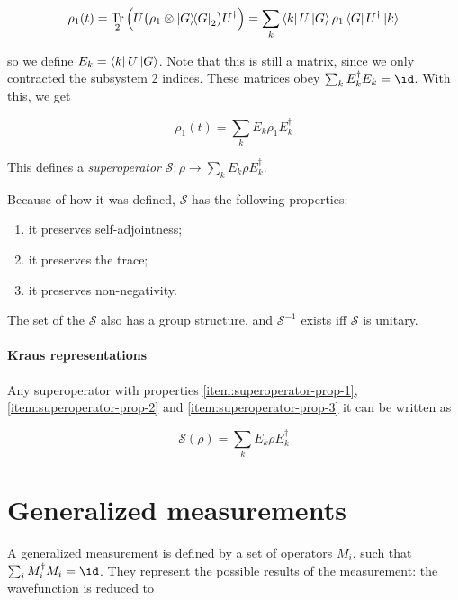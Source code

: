 \documentclass[main.tex]{subfiles}
\begin{document}
\begin{equation}
    \rho_1(t) = \Tr_{2} \qty(U\qty(\rho_1 \otimes \dyad{G}_2 )U^\dag)
    = \sum _k \bra{k} U \ket{G} \rho_1 \bra{G} U^\dag \ket{k}
\end{equation}

so we define \(E_k = \bra{k} U \ket{G}\). Note that this is still a matrix, since we only contracted the subsystem 2 indices. These matrices obey \(\sum _{k}  E_k ^\dag E_k = \id\).
With this, we get

\begin{equation}
    \rho_1 (t) = \sum _{k} E_k \rho_1 E_k ^\dag
\end{equation}

This defines a \emph{superoperator} \(\mathcal S: \rho \rightarrow \sum _k E_k \rho E_k ^\dag \).

Because of how it was defined, \(\mathcal S\) has the following properties:

\begin{enumerate}
    \item it preserves self-adjointness; \label{item:superoperator-prop-1}
    \item it preserves the trace;\label{item:superoperator-prop-2}
    \item it preserves non-negativity.\label{item:superoperator-prop-3}
\end{enumerate}

The set of the \(\mathcal S\) also has a group structure, and \(\mathcal S^{-1}\) exists iff \(\mathcal S\) is unitary.

\paragraph{Kraus representations}

Any superoperator with properties \ref{item:superoperator-prop-1}, \ref{item:superoperator-prop-2} and \ref{item:superoperator-prop-3} it  can be written as

\begin{equation} \label{eq:kraus-superoperator}
    \mathcal S (\rho) = \sum _k E_k \rho E_k ^\dag
\end{equation}

\section{Generalized measurements}

A generalized measurement is defined by a set of operators \(M_i\), such that \(\sum _i M_i ^\dag M_i = \id\). They represent the possible results of the measurement: the wavefunction is reduced to
\end{document}
